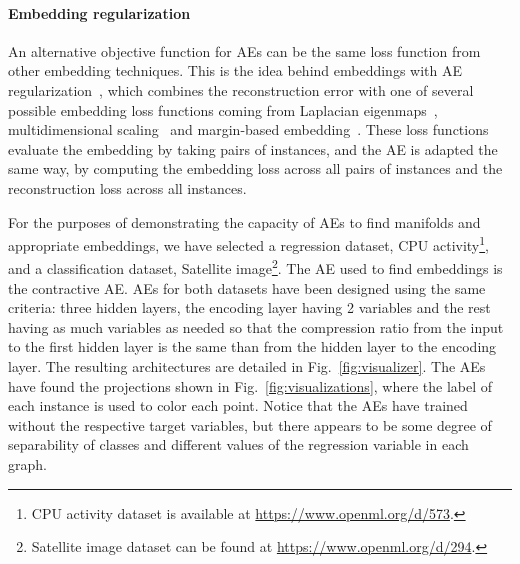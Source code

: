 \documentclass[
	fontsize=11pt, %
	twoside=false, %
	open=any, %
	secnumdepth=1, %
]{kaobook}
\begin{document}
\paragraph{Embedding regularization} An alternative objective function for AEs can be the same loss function from other embedding techniques. This is the idea behind embeddings with AE regularization~\cite{yu2013embedding}, which combines the reconstruction error with one of several possible embedding loss functions coming from Laplacian eigenmaps~\cite{LaplacianEigenmaps}, multidimensional scaling~\cite{MDS} and margin-based embedding~\cite{hadsell2006dimensionality}. These loss functions evaluate the embedding by taking pairs of instances, and the AE is adapted the same way, by computing the embedding loss across all pairs of instances and the reconstruction loss across all instances.

For the purposes of demonstrating the capacity of AEs to find manifolds and appropriate embeddings, we have selected a regression dataset, CPU activity\footnote{CPU activity dataset is available at \url{https://www.openml.org/d/573}.}, and a classification dataset, Satellite image\footnote{Satellite image dataset can be found at \url{https://www.openml.org/d/294}.}. The AE used to find embeddings is the contractive AE. AEs for both datasets have been designed using the same criteria: three hidden layers, the encoding layer having 2 variables and the rest having as much variables as needed so that the compression ratio from the input to the first hidden layer is the same than from the hidden layer to the encoding layer. The resulting architectures are detailed in Fig.~\ref{fig:visualizer}. The AEs have found the projections shown in Fig.~\ref{fig:visualizations}, where the label of each instance is used to color each point. Notice that the AEs have trained without the respective target variables, but there appears to be some degree of separability of classes and different values of the regression variable in each graph.
\end{document}
